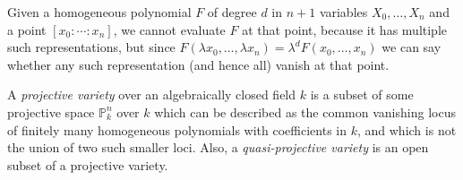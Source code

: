 \documentclass{article}
\begin{document}
Given a homogeneous polynomial $F$ of degree $d$ in $n+1$ variables $X_0,\ldots,X_n$ and a point $[x_0:\cdots:x_n]$, we cannot evaluate $F$ at that point, because it has multiple such representations, but since $F(\lambda x_0,\ldots,\lambda x_n) = \lambda^d F(x_0,\ldots,x_n)$ we can say whether any such representation (and hence all) vanish at that point.

A \emph{projective variety} over an algebraically closed field $k$ is a subset of some projective space $\mathbb{P}^n_k$ over $k$ which can be described as the common vanishing locus of finitely many homogeneous polynomials with coefficients in $k$, and which is not the union of two such smaller loci.  Also, a \emph{quasi-projective variety} is an open subset of a projective variety.
\end{document}
